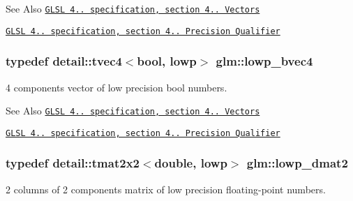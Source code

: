 \begin{DoxySeeAlso}{See Also}
\href{http://www.opengl.org/registry/doc/GLSLangSpec.4.20.8.pdf}{\tt G\-L\-S\-L 4.. specification, section 4.. Vectors} 

\href{http://www.opengl.org/registry/doc/GLSLangSpec.4.20.8.pdf}{\tt G\-L\-S\-L 4.. specification, section 4.. Precision Qualifier} 
\end{DoxySeeAlso}
\hypertarget{group__core__precision_ga24c651dc8cb20779b3773428aef4f7f4}{
\subsubsection[{lowp\-\_\-bvec4}]{\setlength{\rightskip}{0pt plus 5cm}typedef detail\-::tvec4$<$bool, lowp$>$ {\bf glm\-::lowp\-\_\-bvec4}}}\label{group__core__precision_ga24c651dc8cb20779b3773428aef4f7f4}
4 components vector of low precision bool numbers.

\begin{DoxySeeAlso}{See Also}
\href{http://www.opengl.org/registry/doc/GLSLangSpec.4.20.8.pdf}{\tt G\-L\-S\-L 4.. specification, section 4.. Vectors} 

\href{http://www.opengl.org/registry/doc/GLSLangSpec.4.20.8.pdf}{\tt G\-L\-S\-L 4.. specification, section 4.. Precision Qualifier} 
\end{DoxySeeAlso}
\hypertarget{group__core__precision_ga5e08c45dfef867e0326a1eee95060cd0}{
\subsubsection[{lowp\-\_\-dmat2}]{\setlength{\rightskip}{0pt plus 5cm}typedef detail\-::tmat2x2$<$double, lowp$>$ {\bf glm\-::lowp\-\_\-dmat2}}}\label{group__core__precision_ga5e08c45dfef867e0326a1eee95060cd0}
2 columns of 2 components matrix of low precision floating-\/point numbers.

